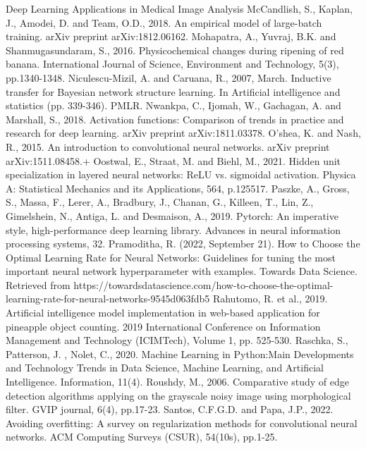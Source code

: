 \documentclass[conference]{IEEEtran}
\begin{document}
\begin{thebibliography}{00}
     Deep Learning Applications in Medical Image Analysis
     McCandlish, S., Kaplan, J., Amodei, D. and Team, O.D., 2018. An empirical model of large-batch training. arXiv preprint arXiv:1812.06162.
     Mohapatra, A., Yuvraj, B.K. and Shanmugasundaram, S., 2016. Physicochemical changes during ripening of red banana. International Journal of Science, Environment and Technology, 5(3), pp.1340-1348.
     Niculescu-Mizil, A. and Caruana, R., 2007, March. Inductive transfer for Bayesian network structure learning. In Artificial intelligence and statistics (pp. 339-346). PMLR.
     Nwankpa, C., Ijomah, W., Gachagan, A. and Marshall, S., 2018. Activation functions: Comparison of trends in practice and research for deep learning. arXiv preprint arXiv:1811.03378.
     O'shea, K. and Nash, R., 2015. An introduction to convolutional neural networks. arXiv preprint arXiv:1511.08458.+
     Oostwal, E., Straat, M. and Biehl, M., 2021. Hidden unit specialization in layered neural networks: ReLU vs. sigmoidal activation. Physica A: Statistical Mechanics and its Applications, 564, p.125517.
     Paszke, A., Gross, S., Massa, F., Lerer, A., Bradbury, J., Chanan, G., Killeen, T., Lin, Z., Gimelshein, N., Antiga, L. and Desmaison, A., 2019. Pytorch: An imperative style, high-performance deep learning library. Advances in neural information processing systems, 32.
     Pramoditha, R. (2022, September 21). How to Choose the Optimal Learning Rate for Neural Networks: Guidelines for tuning the most important neural network hyperparameter with examples. Towards Data Science. Retrieved from https://towardsdatascience.com/how-to-choose-the-optimal-learning-rate-for-neural-networks-9545d063fdb5
     Rahutomo, R. et al., 2019. Artificial intelligence model implementation in web-based application for pineapple object counting. 2019 International Conference on Information Management and Technology (ICIMTech), Volume 1, pp. 525-530.
     Raschka, S., Patterson, J. , Nolet, C., 2020. Machine Learning in Python:Main Developments and Technology Trends in Data Science, Machine
    Learning, and Artificial Intelligence. Information, 11(4).
     Roushdy, M., 2006. Comparative study of edge detection algorithms applying on the grayscale noisy image using morphological filter. GVIP journal, 6(4), pp.17-23.
     Santos, C.F.G.D. and Papa, J.P., 2022. Avoiding overfitting: A survey on regularization methods for convolutional neural networks. ACM Computing Surveys (CSUR), 54(10s), pp.1-25.

\end{thebibliography}
\end{document}
